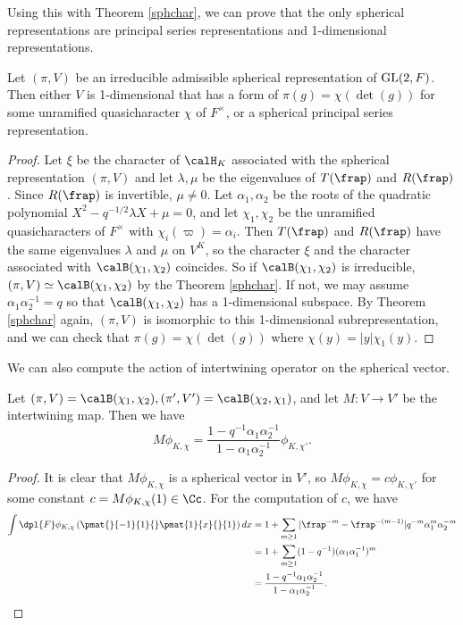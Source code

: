Using this with Theorem \ref{sphchar}, we can prove that the only spherical representations are principal series representations and 1-dimensional representations.
\begin{theorem}
\label{sphps}
Let $(\pi, V)$ be an irreducible admissible spherical representation of $\mathrm{GL}(2, F)$. 
Then either $V$ is 1-dimensional that has a form of $\pi(g) = \chi(\det(g))$ for some unramified quasicharacter $\chi$ of $F^{\times}$, or a spherical principal series representation. 
\end{theorem} 
\begin{proof}
Let $\xi$ be the character of $\calH_K$ associated with the spherical representation $(\pi, V)$ and let $\lambda, \mu$ be the eigenvalues of $T(\frap)$ and $R(\frap)$. 
Since $R(\frap)$ is invertible, $\mu\neq 0$. 
Let $\alpha_1, \alpha_2$ be the roots of the quadratic polynomial $X^{2} - q^{-1/2}\lambda X + \mu = 0$, and let $\chi_1,\chi_2$ be the unramified quasicharacters of $F^{\times}$ with $\chi_i(\varpi) = \alpha_i$. 
Then $T(\frap)$ and $R(\frap)$ have the same eigenvalues $\lambda$ and $\mu$ on $V^{K}$, so the character $\xi$ and the character associated with $\calB(\chi_1, \chi_2)$ coincides. 
So if $\calB(\chi_1, \chi_2)$ is irreducible, $(\pi, V)\simeq \calB(\chi_1, \chi_2)$ by the Theorem \ref{sphchar}. 
If not, we may assume $\alpha_1 \alpha_2^{-1} = q$ so that $\calB(\chi_1, \chi_2)$ has a 1-dimensional subspace. 
By Theorem \ref{sphchar} again, $(\pi, V)$ is isomorphic to this 1-dimensional subrepresentation, and we can check that $\pi(g) = \chi(\det(g))$ where $\chi(y) = |y| \chi_1(y)$. 
\end{proof}

We can also compute the action of intertwining operator on the spherical vector. 
\begin{proposition}
Let $(\pi, V) = \calB(\chi_1, \chi_2), (\pi', V') = \calB(\chi_2, \chi_1)$, and let $M:V\to V'$ be the intertwining map. 
Then we have
$$
M\phi_{K, \chi} = \frac{1-q^{-1}\alpha_{1}\alpha_{2}^{-1}}{1- \alpha_{1}\alpha_{2}^{-1}} \phi_{K, \chi'}. 
$$
\end{proposition}
\begin{proof}
It is clear that $M\phi_{K, \chi}$ is a spherical vector in $V'$, so $M\phi_{K, \chi} = c\phi_{K, \chi'}$ for some constant $c = M\phi_{K, \chi}(1) \in \Cc$. 
For the computation of $c$, we have
\begin{align*}
\int\dpl{F} \phi_{K, \chi}\left(\pmat{}{-1}{1}{} \pmat{1}{x}{}{1}\right) dx &= 1 + \sum_{m\geq 1} |\frap^{-m} - \frap^{-(m-1)}| q^{-m}\alpha_{1}^{m}\alpha_{2}^{-m} \\
&= 1 + \sum_{m\geq 1}(1-q^{-1})(\alpha_{1}\alpha_{1}^{-1})^{m} \\
&= \frac{1-q^{-1}\alpha_{1}\alpha_{2}^{-1}}{1- \alpha_{1}\alpha_{2}^{-1}}.
\end{align*}
\end{proof}

